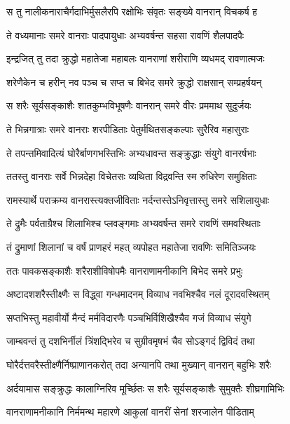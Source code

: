 \twolineshloka
{स तु नालीकनाराचैर्गदाभिर्मुसलैरपि}
{रक्षोभिः संवृतः सङ्ख्ये वानरान् विचकर्ष ह} %

\twolineshloka
{ते वध्यमानाः समरे वानराः पादपायुधाः}
{अभ्यवर्षन्त सहसा रावणिं शैलपादपैः} %

\twolineshloka
{इन्द्रजित् तु तदा क्रुद्धो महातेजा महाबलः}
{वानराणां शरीराणि व्यधमद् रावणात्मजः} %

\twolineshloka
{शरेणैकेन च हरीन् नव पञ्च च सप्त च}
{बिभेद समरे क्रुद्धो राक्षसान् सम्प्रहर्षयन्} %

\twolineshloka
{स शरैः सूर्यसङ्काशैः शातकुम्भविभूषणैः}
{वानरान् समरे वीरः प्रममाथ सुदुर्जयः} %

\twolineshloka
{ते भिन्नगात्राः समरे वानराः शरपीडिताः}
{पेतुर्मथितसङ्कल्पाः सुरैरिव महासुराः} %

\twolineshloka
{ते तपन्तमिवादित्यं घोरैर्बाणगभस्तिभिः}
{अभ्यधावन्त सङ्क्रुद्धाः संयुगे वानरर्षभाः} %

\twolineshloka
{ततस्तु वानराः सर्वे भिन्नदेहा विचेतसः}
{व्यथिता विद्रवन्ति स्म रुधिरेण समुक्षिताः} %

\twolineshloka
{रामस्यार्थे पराक्रम्य वानरास्त्यक्तजीविताः}
{नर्दन्तस्तेऽनिवृत्तास्तु समरे सशिलायुधाः} %

\twolineshloka
{ते द्रुमैः पर्वताग्रैश्च शिलाभिश्च प्लवङ्गमाः}
{अभ्यवर्षन्त समरे रावणिं समवस्थिताः} %

\twolineshloka
{तं द्रुमाणां शिलानां च वर्षं प्राणहरं महत्}
{व्यपोहत महातेजा रावणिः समितिञ्जयः} %

\twolineshloka
{ततः पावकसङ्काशैः शरैराशीविषोपमैः}
{वानराणामनीकानि बिभेद समरे प्रभुः} %

\twolineshloka
{अष्टादशशरैस्तीक्ष्णैः स विद्ध्वा गन्धमादनम्}
{विव्याध नवभिश्चैव नलं दूरादवस्थितम्} %

\twolineshloka
{सप्तभिस्तु महावीर्यो मैन्दं मर्मविदारणैः}
{पञ्चभिर्विशिखैश्चैव गजं विव्याध संयुगे} %

\twolineshloka
{जाम्बवन्तं तु दशभिर्नीलं त्रिंशद्भिरेव च}
{सुग्रीवमृषभं चैव सोऽङ्गदं द्विविदं तथा} %

\twolineshloka
{घोरैर्दत्तवरैस्तीक्ष्णैर्निष्प्राणानकरोत् तदा}
{अन्यानपि तथा मुख्यान् वानरान् बहुभिः शरैः} %

\twolineshloka
{अर्दयामास सङ्क्रुद्धः कालाग्निरिव मूर्च्छितः}
{स शरैः सूर्यसङ्काशैः सुमुक्तैः शीघ्रगामिभिः} %

\twolineshloka
{वानराणामनीकानि निर्ममन्थ महारणे}
{आकुलां वानरीं सेनां शरजालेन पीडिताम्} %

